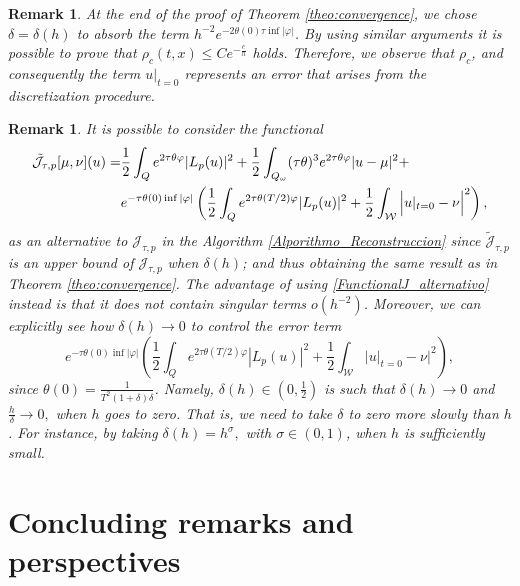 \documentclass{amsart}
\numberwithin{equation}{section}
\newtheorem{remark}[theorem]{Remark}
\begin{document}
\begin{remark}
    At the end of the proof of Theorem \ref{theo:convergence}, we chose $\delta=\delta(h)$ to absorb the term $h^{-2}e^{-2\theta(0)\tau\inf|\varphi|}$. By using similar arguments it is possible to prove that  $\rho_c(t,x)\leq Ce^{-\frac{c}{h}}$ holds. 
    Therefore, we observe that $\rho_c$, and consequently the term $u|_{t=0}$ represents an error that arises from the discretization procedure.
\end{remark}

\begin{remark}
    It is possible to consider the functional \begin{align}\label{FunctionalJ_alternativo}
             \tilde{\mathcal{J}}_{\tau,p}[\mu,\nu](u)=&\frac{1}{2}\int_Qe^{2\tau\theta\varphi}|L_p(u)|^2+\frac{1}{2}\int_{Q_\omega}(\tau\theta)^3e^{2\tau\theta\varphi}|u-\mu|^2+\\
             &
             e^{-\tau\theta(0)\inf|\varphi|}\left(\frac{1}{2}\int_Qe^{2\tau\theta(T/2)\varphi}|L_p(u)|^2+\frac{1}
             {2}\int_{\mathcal{W}}\Big|u|_{t=0}-\nu\Big|^2\right),\notag  
\end{align}
as an alternative to $\mathcal{J}_{\tau,p}$ in the Algorithm \ref{Alporithmo_Reconstruccion} since $\tilde{\mathcal{J}}_{\tau,p}$ is an upper bound of $\mathcal{J}_{\tau,p}$ when $\delta(h)$; and thus obtaining the same result as in Theorem \ref{theo:convergence}. The advantage of using \eqref{FunctionalJ_alternativo} instead is that it does not contain singular terms $o(h^{-2})$. Moreover, we can explicitly see how $\delta(h)\to 0$ to control the error term 
\[ e^{-\tau\theta(0)\inf|\varphi|}\left(\frac{1}{2}\int_Qe^{2\tau\theta(T/2)\varphi}|L_p(u)|^2+\frac{1}
{2}\int_{\mathcal{W}}\Big|u|_{t=0}-\nu\Big|^2\right),\] since $\theta(0)= \frac{1}{T^2(1+\delta)\delta}$. 
Namely, $\delta(h)\in (0,\frac12)$ is such that $\delta(h)\to 0$ and $\frac{h}{\delta}\to 0,$ when $h$ goes to zero. That is, we need to take $\delta$ to zero more slowly than $h$. For instance, by taking $\delta(h)=h^{\sigma},$ with $\sigma\in (0,1)$, when $h$ is sufficiently small.         
\end{remark}






\section{Concluding remarks and perspectives}\label{sec:concluding}
\end{document}
